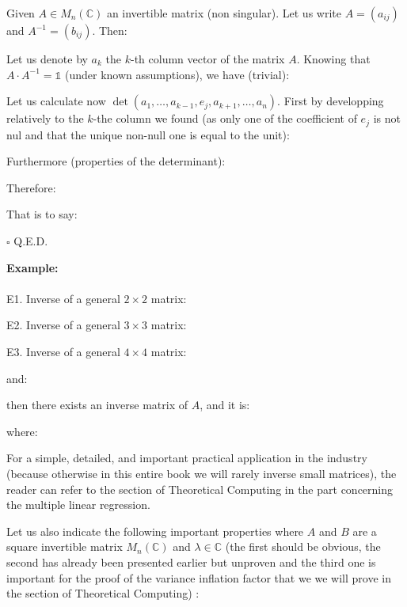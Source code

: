 	Given $A\in M_n(\mathbb{C})$ an invertible matrix (non singular). Let us write $A=(a_{ij})$ and $A^{-1}=(b_{ij})$. Then:
	
	\begin{dem}
	Let us denote by $a_k$ the $k$-th column vector of the matrix $A$. Knowing that $A\cdot A^{-1}=\mathds{1}$ (under known assumptions), we have (trivial):
	
	Let us calculate now $\det(a_1,\ldots,a_{k-1},e_j,a_{k+1},\ldots,a_n)$. First by developping relatively to the $k$-the column we found (as only one of the coefficient of $e_j$ is not nul and that the unique non-null one is equal to the unit):
	
	Furthermore (properties of the determinant):
	
	Therefore:
	
	That is to say:
	
	\begin{flushright}
		$\square$  Q.E.D.
	\end{flushright}
	\end{dem}
	\label{some matrix inverse}
	\begin{tcolorbox}[colframe=black,colback=white,sharp corners]
	\textbf{{\Large {}}Example:}\\\\
	E1. Inverse of a general $2\times 2$ matrix:
	
	
	E2. Inverse of a general $3\times 3$ matrix:
		
	
	E3. Inverse of a general $4\times 4$ matrix:
	
	and:
	\end{tcolorbox}
	
	\begin{tcolorbox}[colframe=black,colback=white,sharp corners]
	
	then there exists an inverse matrix of $A$, and it is:
	
	where:
	
	\end{tcolorbox}
	
	For a simple, detailed, and important practical application in the industry (because otherwise in this entire book we will rarely inverse small matrices), the reader can refer to the section of Theoretical Computing in the part concerning the multiple linear regression.
	
	Let us also indicate the following important properties where $A$ and $B$ are a square invertible matrix $M_{n}(\mathbb{C})$ and $\lambda\in\mathbb{C}$ (the first should be obvious, the second has already been presented earlier but unproven and the third one is important for the proof of the variance inflation factor that we we will prove in the section of Theoretical Computing) :
	
